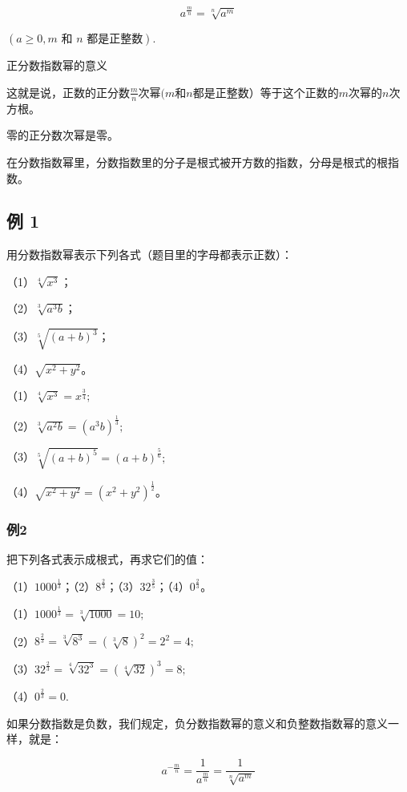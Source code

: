 \[
a ^ {\frac{m}{n}} = \sqrt[n]{a ^ {m}}
\]

\((a \geqslant 0, m \text{ 和 } n \text{ 都是正整数}).\)

正分数指数幂的意义

这就是说，正数的正分数\(\frac{m}{n}\)次幂\((m\)和\(n\)都是正整数）等于这个正数的\(m\)次幂的\(n\)次方根。

零的正分数次幂是零。

在分数指数幂里，分数指数里的分子是根式被开方数的指数，分母是根式的根指数。

\subsection{例 1}

用分数指数幂表示下列各式（题目里的字母都表示正数）：

（1）\(\sqrt[4]{x^3}\)；

（2）\(\sqrt[3]{a^{3}b}\)；

（3）\(\sqrt[5]{(a + b)^3}\)；

（4）\(\sqrt{x^2 + y^2}\)。

 （1）\(\sqrt[4]{x^3} = x^{\frac{3}{4}};\)

（2）\(\sqrt[3]{a^2b} = (a^3b)^{\frac{1}{3}};\)

（3）\(\sqrt[5]{(a + b)^5} = (a + b)^{\frac{5}{6}};\)

（4）\(\sqrt{x^2 + y^2} = (x^2 + y^2)^{\frac{1}{2}}\)。

\subsubsection{例2}

把下列各式表示成根式，再求它们的值：

（1）\(1000^{\frac{1}{3}}\)；（2）\(8^{\frac{2}{3}}\)；（3）\(32^{\frac{3}{5}}\)；（4）\(0^{\frac{2}{3}}\)。

 （1）\(1000^{\frac{1}{3}} = \sqrt[3]{1000} = 10;\)

（2）\(8^{\frac{2}{3}} = \sqrt[3]{8^3} = (\sqrt[3]{8})^2 = 2^2 = 4;\)

（3）\(32^{\frac{2}{3}} = \sqrt[4]{32^3} = (\sqrt[4]{32})^3 = 8;\)

（4）\(0^{\frac{2}{3}} = 0.\)

如果分数指数是负数，我们规定，负分数指数幂的意义和负整数指数幂的意义一样，就是：

\[
a ^ {- \frac{m}{n}} = \frac{1}{a ^ {\frac{m}{n}}} = \frac{1}{\sqrt[n]{a ^ {m}}}
\]

